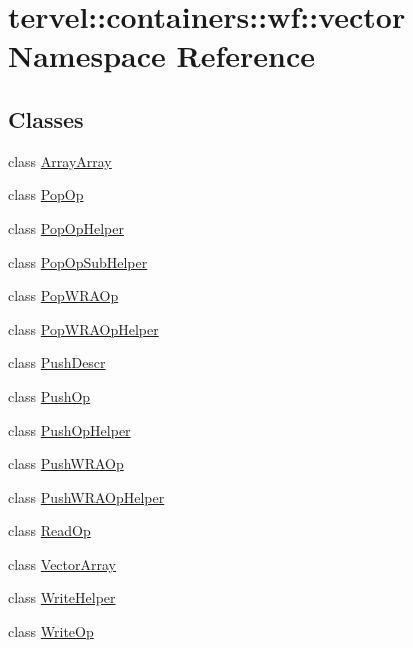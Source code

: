 \hypertarget{namespacetervel_1_1containers_1_1wf_1_1vector}{}\section{tervel\+:\+:containers\+:\+:wf\+:\+:vector Namespace Reference}
\label{namespacetervel_1_1containers_1_1wf_1_1vector}
\subsection*{Classes}
\begin{DoxyCompactItemize}
\item 
class \hyperlink{classtervel_1_1containers_1_1wf_1_1vector_1_1_array_array}{Array\+Array}
\item 
class \hyperlink{classtervel_1_1containers_1_1wf_1_1vector_1_1_pop_op}{Pop\+Op}
\item 
class \hyperlink{classtervel_1_1containers_1_1wf_1_1vector_1_1_pop_op_helper}{Pop\+Op\+Helper}
\item 
class \hyperlink{classtervel_1_1containers_1_1wf_1_1vector_1_1_pop_op_sub_helper}{Pop\+Op\+Sub\+Helper}
\item 
class \hyperlink{classtervel_1_1containers_1_1wf_1_1vector_1_1_pop_w_r_a_op}{Pop\+W\+R\+A\+Op}
\item 
class \hyperlink{classtervel_1_1containers_1_1wf_1_1vector_1_1_pop_w_r_a_op_helper}{Pop\+W\+R\+A\+Op\+Helper}
\item 
class \hyperlink{classtervel_1_1containers_1_1wf_1_1vector_1_1_push_descr}{Push\+Descr}
\item 
class \hyperlink{classtervel_1_1containers_1_1wf_1_1vector_1_1_push_op}{Push\+Op}
\item 
class \hyperlink{classtervel_1_1containers_1_1wf_1_1vector_1_1_push_op_helper}{Push\+Op\+Helper}
\item 
class \hyperlink{classtervel_1_1containers_1_1wf_1_1vector_1_1_push_w_r_a_op}{Push\+W\+R\+A\+Op}
\item 
class \hyperlink{classtervel_1_1containers_1_1wf_1_1vector_1_1_push_w_r_a_op_helper}{Push\+W\+R\+A\+Op\+Helper}
\item 
class \hyperlink{classtervel_1_1containers_1_1wf_1_1vector_1_1_read_op}{Read\+Op}
\item 
class \hyperlink{classtervel_1_1containers_1_1wf_1_1vector_1_1_vector_array}{Vector\+Array}
\item 
class \hyperlink{classtervel_1_1containers_1_1wf_1_1vector_1_1_write_helper}{Write\+Helper}
\item 
class \hyperlink{classtervel_1_1containers_1_1wf_1_1vector_1_1_write_op}{Write\+Op}
\end{DoxyCompactItemize}
